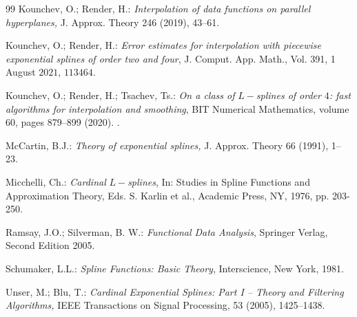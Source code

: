 \documentclass[11pt]{article}%
\begin{document}
\begin{thebibliography}{99}
Kounchev, O.; Render, H.: \emph{Interpolation of data
functions on parallel hyperplanes,} J. Approx. Theory 246 (2019), 43--61.

Kounchev, O.; Render, H.: \emph{Error
estimates for interpolation with piecewise exponential splines of order two
and four}, J. Comput. App. Math., Vol. 391, 1 August $2021$, $113464.$

Kounchev, O.; Render, H.; Tsachev, Ts.:
\emph{On a class of }$L-$\emph{splines of order }$4$\emph{: fast algorithms
for interpolation and smoothing}, BIT Numerical Mathematics, volume 60, pages
879--899 (2020). .

McCartin, B.J.: \emph{Theory of exponential splines,} J.
Approx. Theory 66 (1991), 1--23.

Micchelli, Ch.: \emph{Cardinal }$L-$\emph{splines}, In:
Studies in Spline Functions and Approximation Theory, Eds. S. Karlin et al.,
Academic Press, NY, 1976, pp. 203-250.

Ramsay, J.O.; Silverman, B. W.: \emph{Functional
Data Analysis}, Springer Verlag, Second Edition 2005.

Schumaker, L.L.: \emph{Spline Functions: Basic Theory},
Interscience, New York, 1981.

Unser, M.; Blu, T.: \emph{Cardinal Exponential Splines: Part I
-- Theory and Filtering Algorithms,} IEEE Transactions on Signal Processing,
53 (2005), 1425--1438.
\end{thebibliography}
\end{document}
